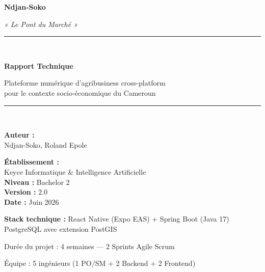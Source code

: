 \documentclass[12pt,a4paper]{report}
\begin{document}
\begin{titlepage}
  \centering
  \vspace*{1.5cm}
  {\Huge\bfseries\color{mainblue} Ndjan-Soko\par}
  \vspace{0.4cm}
  {\Large\itshape « Le Pont du Marché »\par}
  \vspace{1.5cm}
  \rule{\linewidth}{1pt}\\[0.4cm]
  {\LARGE\bfseries Rapport Technique\par}
  {\large Plateforme numérique d'agribusiness cross-platform\\
  pour le contexte socio-économique du Cameroun\par}
  \rule{\linewidth}{1pt}\\[1.5cm]

  \begin{minipage}[t]{0.45\textwidth}
    \textbf{Auteur :}\\
    Ndjan-Soko, Roland Epole
  \end{minipage}
  \hfill
  \begin{minipage}[t]{0.45\textwidth}
    \raggedleft
    \textbf{Établissement :}\\
    Keyce Informatique \& Intelligence Artificielle\\
    \textbf{Niveau :} Bachelor 2\\
    \textbf{Version :} 2.0\\
    \textbf{Date :} Juin 2026
  \end{minipage}

  \vfill
  {\large\textbf{Stack technique :} React Native (Expo EAS) + Spring Boot (Java 17)\\
  PostgreSQL avec extension PostGIS\par}
  \vspace{0.5cm}
  {\small Durée du projet : 4 semaines — 2 Sprints Agile Scrum\par
  Équipe : 5 ingénieurs (1 PO/SM + 2 Backend + 2 Frontend)\par}
\end{titlepage}


\end{document}
